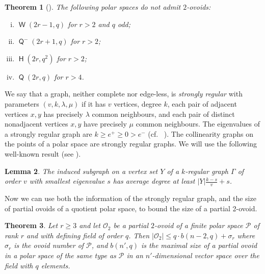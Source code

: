 \documentclass[a4paper,11pt]{amsproc}
\theoremstyle{plain}
\newtheorem{Theorem} {Theorem} [section]
\newtheorem{Lemma} [Theorem] {Lemma}
\theoremstyle{definition}
\newcommand{\cP}{{\mathcal P}}
\newcommand{\<}{\langle}
\renewcommand{\>}{\rangle} %
\newcommand{\onum}{\sigma}
\DeclareMathOperator\h{\mathsf{H}}
\DeclareMathOperator\w{\mathsf{W}}
\DeclareMathOperator\q{\mathsf{Q}}
\begin{document}
\begin{Theorem}[{\cite[Theorem 14]{BKLP2007}}]\label{BKLP_Theorem14}\samepage
The following polar spaces do not admit $2$-ovoids:
\begin{enumerate}[(i)]
\item $\w(2r-1,q)$ for $r>2$ and $q$ odd; 
\item $\q^-(2r+1,q)$ for $r>2$;
\item $\h(2r,q^2)$ for $r>2$;
\item $\q(2r,q)$ for $r>4$.
\end{enumerate}
\end{Theorem}

We say that a graph, neither complete nor edge-less, is \emph{strongly regular}
with parameters $(v, k, \lambda, \mu)$ if it has $v$ vertices, degree $k$,
each pair of adjacent vertices $x,y$ has precisely $\lambda$ common neighbours,
and each pair of distinct nonadjacent vertices $x,y$ have precisely $\mu$
common neighbours. The eigenvalues of a strongly regular graph 
are $k \geq e^+ \geq 0 > e^-$ (cf.~ \cite{BvM}).
The collinearity graphs on the points of a polar space 
are strongly regular graphs. We will use the following well-known result (see \cite[Prop.\ 1.1.6]{BvM}).

\begin{Lemma}\label{lem:ind_gr}
 The induced subgraph on a vertex set $Y$ of a $k$-regular 
 graph $\Gamma$ of order $v$ with smallest eigenvalue $s$ 
 has average degree at least $|Y| \frac{k-s}{v} + s$.
\end{Lemma}

Now we can use both the information of the strongly regular graph, and the size of partial ovoids
of a quotient polar space, to bound the size of a partial 2-ovoid.



\begin{Theorem}\label{partial2ovoids} \label{W_2_ovoid}
  Let $r\ge 3$ and let $\mathcal{O}_2$ be a partial $2$-ovoid of a finite polar space $\mathcal{P}$ of rank $r$
  and with defining field of order $q$.
  Then $|\mathcal{O}_2|\le q \cdot b(n-2, q)+ \onum_r$ where $\onum_r$ is the ovoid number of $\mathcal{P}$,
  and $b(n', q)$ is the maximal size of a partial ovoid in a polar space 
  of the same type as $\cP$ in an $n'$-dimensional vector space over the field with $q$ elements.
\end{Theorem}
\end{document}
